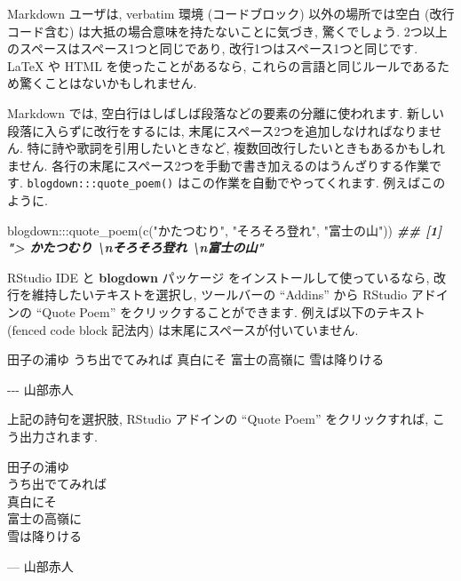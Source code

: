 \documentclass[
  11pt,
  lualatex,ja=standard,jafont=noto]{bxjsreport}
\newenvironment{Shaded}{\begin{snugshade}}{\end{snugshade}}
\newcommand{\DocumentationTok}[1]{\textcolor[rgb]{0.56,0.35,0.01}{\textbf{\textit{#1}}}}
\newcommand{\FunctionTok}[1]{\textcolor[rgb]{0.00,0.00,0.00}{#1}}
\newcommand{\NormalTok}[1]{#1}
\newcommand{\SpecialCharTok}[1]{\textcolor[rgb]{0.00,0.00,0.00}{#1}}
\newcommand{\StringTok}[1]{\textcolor[rgb]{0.31,0.60,0.02}{#1}}
\renewenvironment{quote}{\def\FrameCommand{{\color{quotebarcolor}{\vrule width 3pt}}\hspace{10pt}}\MakeFramed{\advance\hsize-\width\FrameRestore}}{\endMakeFramed}
\begin{document}
Markdown ユーザは, verbatim 環境 (コードブロック) 以外の場所では空白 (改行コード含む) は大抵の場合意味を持たないことに気づき, 驚くでしょう. 2つ以上のスペースはスペース1つと同じであり, 改行1つはスペース1つと同じです. LaTeX や HTML を使ったことがあるなら, これらの言語と同じルールであるため驚くことはないかもしれません.

Markdown では, 空白行はしばしば段落などの要素の分離に使われます. 新しい段落に入らずに改行をするには, 末尾にスペース2つを追加しなければなりません. 特に詩や歌詞を引用したいときなど, 複数回改行したいときもあるかもしれません. 各行の末尾にスペース2つを手動で書き加えるのはうんざりする作業です. \texttt{blogdown:::quote\_poem()} はこの作業を自動でやってくれます. 例えばこのように.

\begin{Shaded}
\begin{Highlighting}[numbers=left,,]
\NormalTok{blogdown}\SpecialCharTok{:::}\FunctionTok{quote\_poem}\NormalTok{(}\FunctionTok{c}\NormalTok{(}\StringTok{"かたつむり"}\NormalTok{, }\StringTok{"そろそろ登れ"}\NormalTok{, }
  \StringTok{"富士の山"}\NormalTok{))}
\DocumentationTok{\#\# [1] "\textgreater{} かたつむり  \textbackslash{}nそろそろ登れ  \textbackslash{}n富士の山"}
\end{Highlighting}
\end{Shaded}

RStudio IDE と \textbf{blogdown} パッケージ \autocite{R-blogdown} をインストールして使っているなら, 改行を維持したいテキストを選択し, ツールバーの ``Addins'' から RStudio アドインの ``Quote Poem'' をクリックすることができます. 例えば以下のテキスト (fenced code block 記法内) は末尾にスペースが付いていません.

\begin{Shaded}
\begin{Highlighting}[]
\NormalTok{田子の浦ゆ}
\NormalTok{うち出でてみれば}
\NormalTok{真白にそ}
\NormalTok{富士の高嶺に}
\NormalTok{雪は降りける}

\NormalTok{{-}{-}{-} 山部赤人}
\end{Highlighting}
\end{Shaded}

上記の詩句を選択肢, RStudio アドインの ``Quote Poem'' をクリックすれば, こう出力されます.

\begin{quote}
田子の浦ゆ\\
うち出でてみれば\\
真白にそ\\
富士の高嶺に\\
雪は降りける

\begin{flushright}
--- 山部赤人

\end{flushright}
\end{quote}
\end{document}
